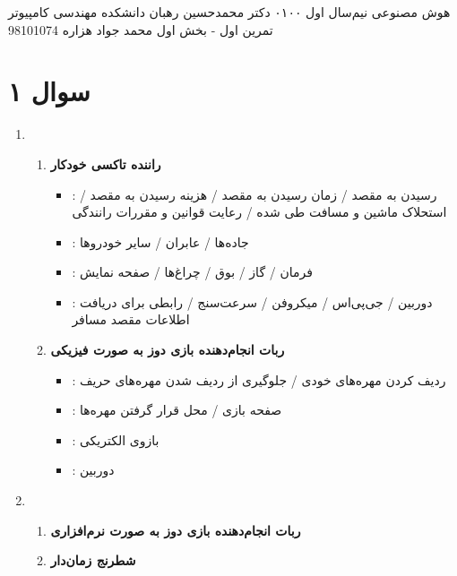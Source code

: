\documentclass[a4paper, 11pt]{article}
\begin{document}
\handout
{هوش مصنوعی}
{نیم‌سال اول ۰۱\lr{-}۰۰}
{دکتر محمدحسین رهبان}
{دانشکده مهندسی کامپیوتر}
{تمرین اول - بخش اول}
{محمد جواد هزاره}
{98101074}
\noindent
\\ [-5em]
\section*{سوال ۱}

\begin{enumerate}[(آ)]
	\item
	\begin{enumerate}[1.]
		\item \textbf{راننده تاکسی خودکار}
		\begin{itemize}
			\item {}:
			رسیدن به مقصد / زمان رسیدن به مقصد / هزینه رسیدن به مقصد / استحلاک ماشین و مسافت طی شده / رعایت قوانین و مقررات رانندگی
			\item {}:
			جاده‌ها / عابران / سایر خودرو‌ها
			\item {}:
			فرمان / گاز / بوق / چراغ‌ها / صفحه نمایش
			\item {}:
			دوربین / جی‌پی‌اس / میکروفن / سرعت‌سنج / رابطی برای دریافت اطلاعات مقصد مسافر
		\end{itemize}

		\item \textbf{ربات انجام‌دهنده بازی دوز به صورت فیزیکی}
		\begin{itemize}
			\item {}:
			ردیف کردن مهره‌های خودی / جلوگیری از ردیف شدن مهره‌های حریف
			\item {}:
			صفحه بازی / محل قرار گرفتن مهره‌ها
			\item {}:
			بازوی الکتریکی
			\item {}:
			دوربین
		\end{itemize}
	
	\end{enumerate}
	\item
	\begin{enumerate}[1.]
		\item \textbf{ربات انجام‌دهنده بازی دوز به صورت نرم‌افزاری}\\
		\item \textbf{شطرنج زمان‌دار}\\
	\end{enumerate}
\end{enumerate}
\end{document}
